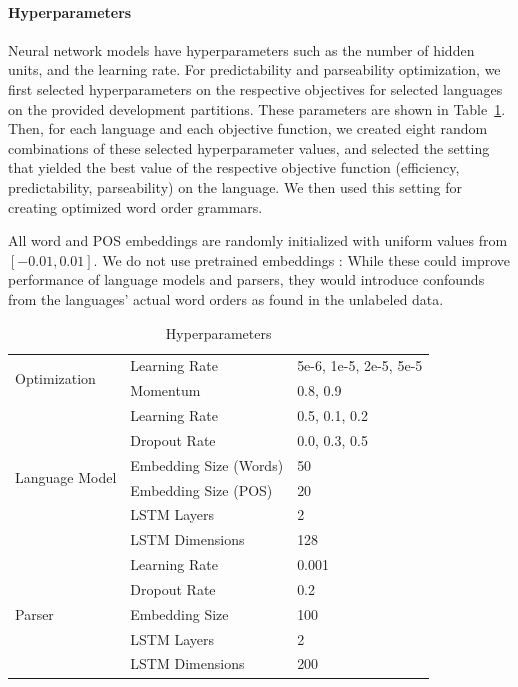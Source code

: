 \documentclass[10pt,twoside,lineno]{article}
\begin{document}
\paragraph{Hyperparameters}
Neural network models have hyperparameters such as the number of hidden units, and the learning rate. 
For predictability and parseability optimization, we first selected hyperparameters on the respective objectives for selected languages on the provided development partitions.
These parameters are shown in Table~\ref{tab:hyperparameters}.
Then, for each language and each objective function, we created eight random combinations of these selected hyperparameter values, and selected the setting that yielded the best value of the respective objective function (efficiency, predictability, parseability) on the language. We then used this setting for creating optimized word order grammars. 




All word and POS embeddings are randomly initialized with uniform values from $[-0.01, 0.01]$.
We do not use pretrained embeddings \citep{peters2018deep}: While these could improve performance of language models and parsers, they would introduce confounds from the languages' actual word orders as found in the unlabeled data.


\begin{table}[]
    \centering
    \begin{tabular}{|l|l|l|}
\hline
\multirow{2}{*}{Optimization}&    Learning Rate     & 5e-6, 1e-5, 2e-5, 5e-5 \\
&    Momentum & 0.8, 0.9 \\ \hline
\multirow{6}{*}{Language Model} &    Learning Rate  & 0.5, 0.1, 0.2 \\
&    Dropout Rate& 0.0, 0.3, 0.5 \\
& Embedding Size (Words) & 50 \\
& Embedding Size (POS) & 20 \\
&    LSTM Layers  & 2 \\
&    LSTM Dimensions  & 128 \\
 \hline
\multirow{5}{*}{Parser}&    Learning Rate  & 0.001 \\
&    Dropout Rate  & 0.2 \\
&    Embedding Size  & 100 \\
&    LSTM Layers  & 2 \\
&    LSTM Dimensions  & 200 \\
\hline
    \end{tabular}
    \caption{Hyperparameters}
    \label{tab:hyperparameters}
\end{table}
\end{document}
